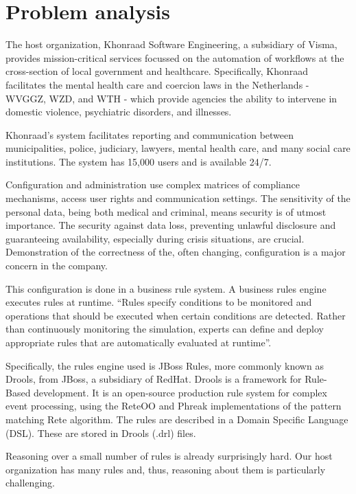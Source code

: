 \section{Problem analysis}

The host organization, Khonraad Software Engineering, a subsidiary of Visma, provides mission-critical services focussed on the automation of workflows at the cross-section of local government and healthcare.
Specifically, Khonraad facilitates the mental health care and coercion laws in the Netherlands - WVGGZ, WZD, and WTH - which provide agencies the ability to intervene in domestic violence, psychiatric disorders, and illnesses.

Khonraad's system facilitates reporting and communication between municipalities, police, judiciary, lawyers, mental health care, and many social care institutions.
The system has 15,000 users and is available 24/7. 

Configuration and administration use complex matrices of compliance mechanisms, access user rights and communication settings.
The sensitivity of the personal data, being both medical and criminal, means security is of utmost importance.
The security against data loss, preventing unlawful disclosure and guaranteeing availability, especially during crisis situations, are crucial.
Demonstration of the correctness of the, often changing, configuration is a major concern in the company. 

This configuration is done in a business rule system. 
A business rules engine executes rules at runtime. 
``Rules specify conditions to be monitored and operations that should be executed when certain conditions are detected.
Rather than continuously monitoring the simulation, experts can define and deploy appropriate rules that are automatically evaluated at runtime''\cite{liu2003dios++}. 

Specifically, the rules engine used is JBoss Rules, more commonly known as Drools, from JBoss, a subsidiary of RedHat\cite{browne2009jboss}.
Drools is a framework for Rule-Based development.
It is an open-source production rule system for complex event processing, using the ReteOO and Phreak implementations of the pattern matching Rete algorithm\cite{forgy1989rete}.
The rules are described in a Domain Specific Language (DSL).
These are stored in Drools (.drl) files. 

Reasoning over a small number of rules is already surprisingly hard.
Our host organization has many rules and, thus, reasoning about them is particularly challenging.

